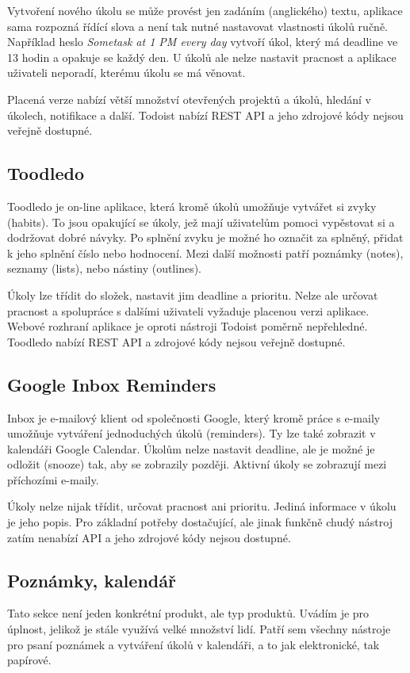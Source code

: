 \documentclass[thesis=B,czech]{FITthesis}[2012/06/26]
\begin{document}
			Vytvoření nového úkolu se může provést jen zadáním (anglického) textu, aplikace sama rozpozná řídící slova a není tak nutné nastavovat vlastnosti úkolů ručně. Například heslo \textit{Sometask at 1 PM every day} vytvoří úkol, který má deadline ve 13 hodin a opakuje se každý den. U úkolů ale nelze nastavit pracnost a aplikace uživateli neporadí, kterému úkolu se má věnovat.
			
			Placená verze nabízí větší množství otevřených projektů a úkolů, hledání v úkolech, notifikace a další.\cite{todoist-compare-premium} Todoist nabízí REST API\cite{todoist-api} a jeho zdrojové kódy nejsou veřejně dostupné.
			
		\subsection{Toodledo}
			Toodledo \cite{toodledo} je on-line aplikace, která kromě úkolů umožňuje vytvářet si zvyky (habits). To jsou opakující se úkoly, jež mají uživatelům pomoci vypěstovat si a dodržovat dobré návyky. Po splnění zvyku je možné ho označit za splněný, přidat k jeho splnění číslo nebo hodnocení. Mezi další možnosti patří poznámky (notes), seznamy (lists), nebo nástiny (outlines). 
			
			Úkoly lze třídit do složek, nastavit jim deadline a prioritu. Nelze ale určovat pracnost a spolupráce s dalšími uživateli vyžaduje placenou verzi aplikace. Webové rozhraní aplikace je oproti nástroji Todoist poměrně nepřehledné. Toodledo nabízí REST API\cite{toodledo-api} a zdrojové kódy nejsou veřejně dostupné.
			
		\subsection{Google Inbox Reminders}
			Inbox \cite{ginbox} je e-mailový klient od společnosti Google, který kromě práce s e-maily umožňuje vytváření jednoduchých úkolů (reminders). Ty lze také zobrazit v kalendáři Google Calendar.\cite{gcal} Úkolům nelze nastavit deadline, ale je možné je odložit (snooze) tak, aby se zobrazily později. Aktivní úkoly se zobrazují mezi příchozími e-maily.
			
			Úkoly nelze nijak třídit, určovat pracnost ani prioritu. Jediná informace v úkolu je jeho popis. Pro základní potřeby dostačující, ale jinak funkčně chudý nástroj zatím nenabízí API a jeho zdrojové kódy nejsou dostupné.
			
			
			
		\subsection{Poznámky, kalendář}
			Tato sekce není jeden konkrétní produkt, ale typ produktů. Uvádím je pro úplnost, jelikož je stále využívá velké množství lidí. Patří sem všechny nástroje pro psaní poznámek a vytváření úkolů v kalendáři, a to jak elektronické, tak papírové. 
			
\end{document}
